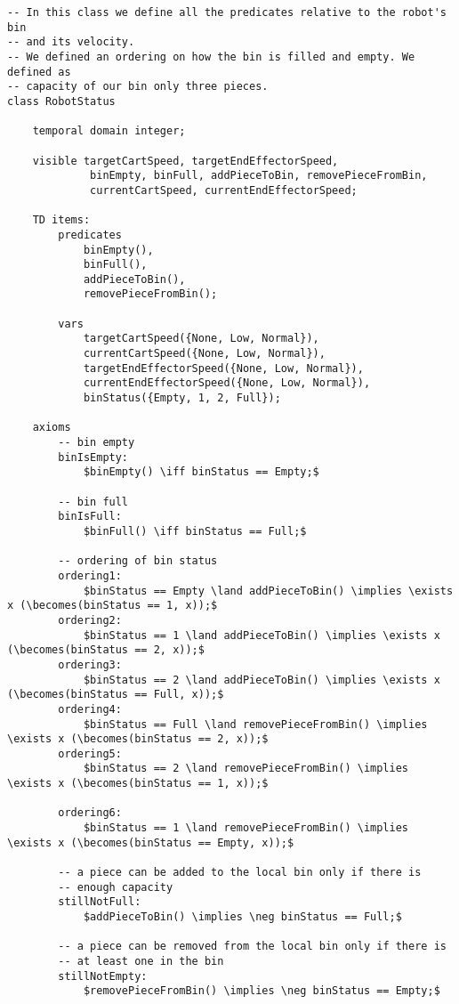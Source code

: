 \begin{lstlisting}[fontadjust, mathescape, frame=single] 
-- In this class we define all the predicates relative to the robot's bin 
-- and its velocity.
-- We defined an ordering on how the bin is filled and empty. We defined as 
-- capacity of our bin only three pieces.
class RobotStatus

    temporal domain integer;

    visible targetCartSpeed, targetEndEffectorSpeed, 
             binEmpty, binFull, addPieceToBin, removePieceFromBin,
             currentCartSpeed, currentEndEffectorSpeed;

    TD items:
        predicates
            binEmpty(),
            binFull(),
            addPieceToBin(),
            removePieceFromBin();

        vars
            targetCartSpeed({None, Low, Normal}),
            currentCartSpeed({None, Low, Normal}),
            targetEndEffectorSpeed({None, Low, Normal}),
            currentEndEffectorSpeed({None, Low, Normal}),
            binStatus({Empty, 1, 2, Full});

    axioms
        -- bin empty
        binIsEmpty:
            $binEmpty() \iff binStatus == Empty;$

        -- bin full
        binIsFull:
            $binFull() \iff binStatus == Full;$

        -- ordering of bin status
        ordering1:
            $binStatus == Empty \land addPieceToBin() \implies \exists x (\becomes(binStatus == 1, x));$
        ordering2:
            $binStatus == 1 \land addPieceToBin() \implies \exists x (\becomes(binStatus == 2, x));$
        ordering3:
            $binStatus == 2 \land addPieceToBin() \implies \exists x (\becomes(binStatus == Full, x));$
        ordering4:
            $binStatus == Full \land removePieceFromBin() \implies \exists x (\becomes(binStatus == 2, x));$
        ordering5:
            $binStatus == 2 \land removePieceFromBin() \implies \exists x (\becomes(binStatus == 1, x));$

        ordering6:
            $binStatus == 1 \land removePieceFromBin() \implies \exists x (\becomes(binStatus == Empty, x));$

        -- a piece can be added to the local bin only if there is 
        -- enough capacity
        stillNotFull:
            $addPieceToBin() \implies \neg binStatus == Full;$

        -- a piece can be removed from the local bin only if there is
        -- at least one in the bin
        stillNotEmpty:
            $removePieceFromBin() \implies \neg binStatus == Empty;$


\end{lstlisting}
